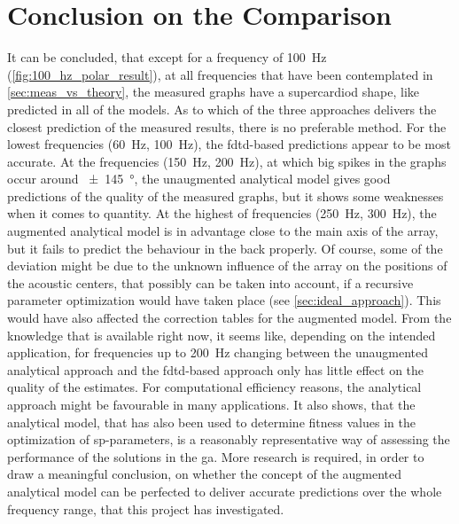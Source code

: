 \section{Conclusion on the Comparison}\label{meas_vs_theory_conclusion}
It can be concluded, that except for a frequency of \SI{100}{\hertz} (\autoref{fig:100_hz_polar_result}), at all frequencies that have been contemplated in \autoref{sec:meas_vs_theory}, the measured graphs have a supercardiod shape, like predicted in all of the models. As to which of the three approaches delivers the closest prediction of the measured results, there is no preferable method. For the lowest frequencies (\SI{60}{\hertz}, \SI{100}{\hertz}), the \gls{fdtd}-based predictions appear to be most accurate. At the frequencies (\SI{150}{\hertz}, \SI{200}{\hertz}), at which big spikes in the graphs occur around \SI{\pm 145}{\degree}, the unaugmented analytical model gives good predictions of the quality of the measured graphs, but it shows some weaknesses when it comes to quantity. At the highest of frequencies (\SI{250}{\hertz}, \SI{300}{\hertz}), the augmented analytical model is in advantage close to the main axis of the array, but it fails to predict the behaviour in the back properly. Of course, some of the deviation might be due to the unknown influence of the array on the positions of the acoustic centers, that possibly can be taken into account, if a recursive parameter optimization would have taken place (see \autoref{sec:ideal_approach}). This would have also affected the correction tables for the augmented model. From the knowledge that is available right now, it seems like, depending on the intended application, for frequencies up to \SI{200}{\hertz} changing between the unaugmented analytical approach and the \gls{fdtd}-based approach only has little effect on the quality of the estimates. For computational efficiency reasons, the analytical approach might be favourable in many applications. It also shows, that the analytical model, that has also been used to determine fitness values in the optimization of \gls{sp}-parameters, is a reasonably representative way of assessing the performance of the solutions in the \gls{ga}. More research is required, in order to draw a meaningful conclusion, on whether the concept of the augmented analytical model can be perfected to deliver accurate predictions over the whole frequency range, that this project has investigated.